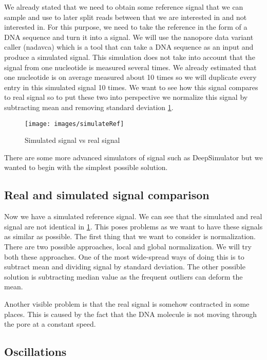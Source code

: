 We already stated that we need to obtain some reference signal that we
can sample and use to later split reads between that we are interested in and not
interested in. For this purpose, we need to take the reference in the form of a DNA sequence
and turn it into a signal. We will use the nanopore data
variant caller (nadavca) which is a tool that can take a DNA sequence as an input
and produce a simulated signal. This simulation does not take into account that
the signal from one nucleotide is measured several times. We already estimated
that one nucleotide is on average measured about 10 times so we will duplicate every
entry in this simulated signal 10 times. We want to see how this signal compares
to real signal so to put these two into perspective we normalize this signal by
subtracting mean and removing standard deviation \ref{obr:simVsReal}.

\begin{figure}
\centerline{\texttt{[image: images/simulateRef]}}
\caption[Hehe]{Simulated signal vs real signal}
\label{obr:simVsReal}
\end{figure}

There are some more advanced simulators of signal such as DeepSimulator but we
wanted to begin with the simplest possible solution.

\subsection{Real and simulated signal comparison}

Now we have a simulated reference signal. We can see that the simulated and real
signal are not identical in \ref{obr:simVsReal}. This poses problems as we want to have these signals as
similar as possible. The first thing that we want to consider is normalization. There
are two possible approaches, local and global normalization. We will try both these
approaches. One of the most wide-spread ways of doing this is to subtract mean and dividing
signal by standard deviation. The other possible solution is subtracting median value
as the frequent outliers can deform the mean. 

Another visible problem is that the real signal is somehow contracted
in some places. This is caused by the fact that the DNA molecule is not moving
through the pore at a constant speed. 

\subsection{Oscillations}

